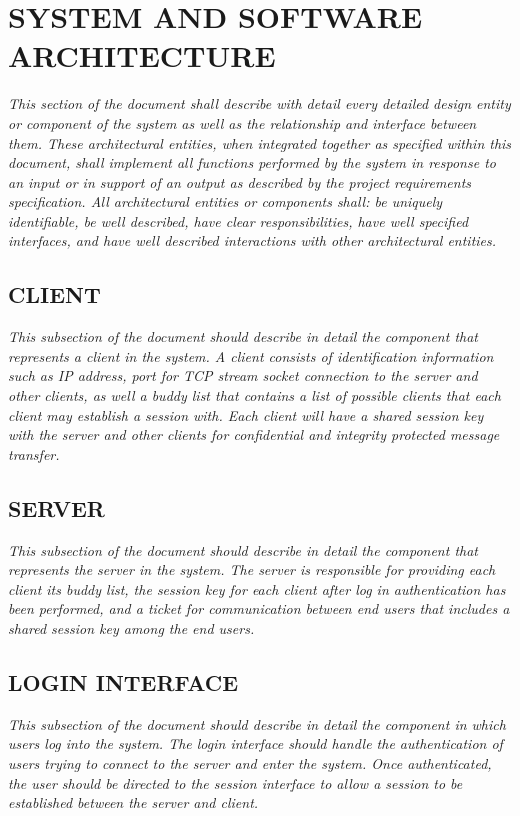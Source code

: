 \documentclass[twoside,letterpaper]{article}
\begin{document}
\clearpage\setcounter{page}{1}\pagestyle{Convertvi}
\section[SYSTEM AND SOFTWARE
ARCHITECTURE]{\bfseries\color{black} SYSTEM AND
SOFTWARE ARCHITECTURE}
{\itshape\color{black}
This section of the document shall describe with detail every detailed
design entity or component of the system as well as the relationship
and interface between them. These architectural entities, when
integrated together as specified within this document, shall implement
all functions performed by the system in response to an input or in
support of an output as described by the project requirements specification.
All architectural entities or components shall: be uniquely identifiable, be well described,
have clear responsibilities, have well specified interfaces, and have
well described interactions with other architectural entities. \ }

\subsection{CLIENT}
{\itshape\color{black}
This subsection of the document should describe in detail the component that represents
a client in the system. A client consists of identification information such as IP address, port
for TCP stream socket connection to the server and other clients, as well a buddy list that contains a
list of possible clients that each client may establish a session with. Each client
will have a shared session key with the server and other clients for confidential and 
integrity protected message transfer. \ }

\subsection{SERVER}
{\itshape\color{black}
This subsection of the document should describe in detail the component that represents the
server in the system. The server is responsible for providing each client its buddy list,
the session key for each client after log in authentication has been performed, and a ticket
for communication between end users that includes a shared session key among the end users. \ }

\subsection{LOGIN INTERFACE}
{\itshape\color{black}
This subsection of the document should describe in detail the component in which
users log into the system. The login interface should handle the authentication of users
trying to connect to the server and enter the system. Once authenticated, the user should
be directed to the session interface to allow a session to be established between the server and
client. \ }
 
\end{document}
